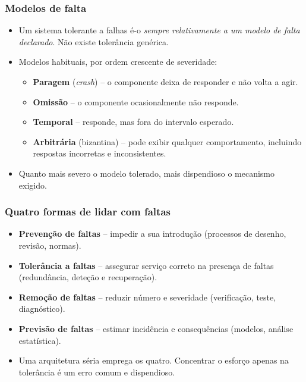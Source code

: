 \documentclass[aspectratio=169]{beamer}
\begin{document}
\begin{frame}
\frametitle{Modelos de falta}
\begin{itemize}
    \setlength\itemsep{0.3cm}
    \item Um sistema tolerante a falhas é-o \emph{sempre relativamente a um modelo de falta declarado}. Não existe tolerância genérica.
    \item Modelos habituais, por ordem crescente de severidade:
    \begin{itemize}
      \item \textbf{Paragem} (\emph{crash}) -- o componente deixa de responder e não volta a agir.
      \item \textbf{Omissão} -- o componente ocasionalmente não responde.
      \item \textbf{Temporal} -- responde, mas fora do intervalo esperado.
      \item \textbf{Arbitrária} (bizantina) -- pode exibir qualquer comportamento, incluindo respostas incorretas e inconsistentes.
    \end{itemize}
    \item Quanto mais severo o modelo tolerado, mais dispendioso o mecanismo exigido.
\end{itemize}
\end{frame}

\begin{frame}
\frametitle{Quatro formas de lidar com faltas}
\begin{itemize}
    \setlength\itemsep{0.35cm}
    \item \textbf{Prevenção de faltas} -- impedir a sua introdução (processos de desenho, revisão, normas).
    \item \textbf{Tolerância a faltas} -- assegurar serviço correto na presença de faltas (redundância, deteção e recuperação).
    \item \textbf{Remoção de faltas} -- reduzir número e severidade (verificação, teste, diagnóstico).
    \item \textbf{Previsão de faltas} -- estimar incidência e consequências (modelos, análise estatística).
    \item Uma arquitetura séria emprega os quatro. Concentrar o esforço apenas na tolerância é um erro comum e dispendioso.
\end{itemize}
\end{frame}
\end{document}
